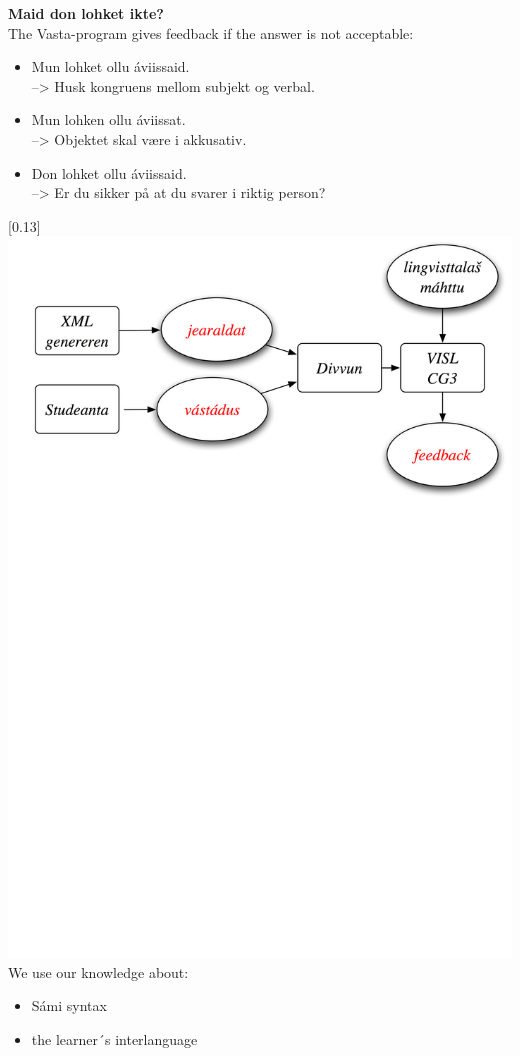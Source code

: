 \documentclass[landscape,norsk,11pt]{seminar}
\begin{document}
\begin{slide}
\newslide
\textbf{Maid don lohket ikte?}\\
The Vasta-program gives feedback if the answer is not acceptable:
\begin{itemize}
\item Mun lohket ollu \'aviissaid. \\ --> Husk kongruens mellom subjekt og verbal.
\item Mun lohken ollu \'aviissat. \\ --> Objektet skal være i akkusativ.
\item Don lohket ollu \'aviissaid. \\ --> Er du sikker på at du svarer i riktig person?
\end{itemize}

\newslide
\scalebox{0.13}[0.13]{\includegraphics{img/skovi.png}} 
\newslide
We use our knowledge about:
\begin{itemize}
\item Sámi syntax
\item the learner´s interlanguage
\end{itemize}


\end{slide}
\end{document}
